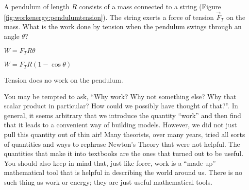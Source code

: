 \begin{checkpoint}
\begin{MCquestion}
{A pendulum of length $R$ consists of a mass connected to a string (Figure \ref{fig:workenergy:pendulumtension}). The string exerts a force of tension $\vec F_T$ on the mass. What is the work done by tension when the pendulum swings through an angle $\theta$?
} 
\item $W=F_TR\theta$
\item $W=F_TR(1-\cos\theta)$
\item Tension does no work on the pendulum. \correct
\end{MCquestion}
\end{checkpoint}

You may be tempted to ask, ``Why work? Why not something else? Why that scalar product in particular? How could we possibly have thought of that?''. In general, it seems arbitrary that we introduce the quantity ``work'' and then find that it leads to a convenient way of building models. However, we did not just pull this quantity out of thin air! Many theorists, over many years, tried all sorts of quantities and ways to rephrase Newton's Theory that were not helpful. The quantities that make it into textbooks are the ones that turned out to be useful. You should also keep in mind that, just like force, work is a ``made-up'' mathematical tool that is helpful in describing the world around us. There is no such thing as work or energy; they are just useful mathematical tools.

